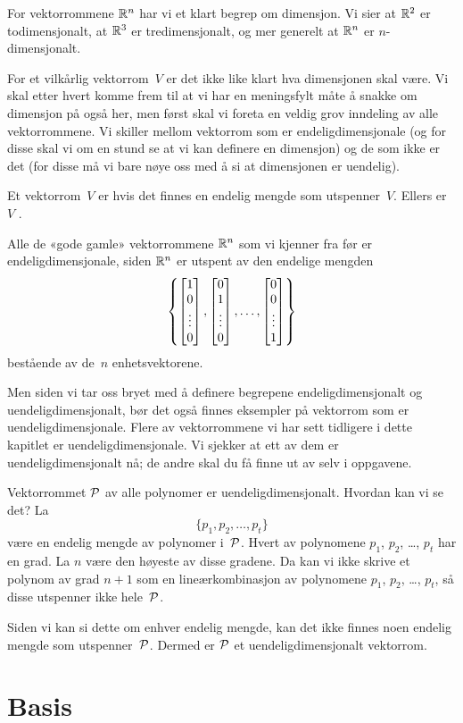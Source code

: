 For vektorrommene $\R^n$ har vi et klart begrep om dimensjon.  Vi sier
at $\R^2$ er todimensjonalt, at $\R^3$ er tredimensjonalt, og mer
generelt at $\R^n$ er $n$-dimensjonalt.

For et vilkårlig vektorrom~$V$ er det ikke like klart hva dimensjonen
skal være.  Vi skal etter hvert komme frem til at vi har en
meningsfylt måte å snakke om dimensjon på også her, men først skal vi
foreta en veldig grov inndeling av alle vektorrommene.  Vi skiller
mellom vektorrom som er endeligdimensjonale (og for disse skal vi om
en stund se at vi kan definere en dimensjon) og de som ikke er det
(for disse må vi bare nøye oss med å si at dimensjonen er uendelig).

\begin{defn}
Et vektorrom~$V$ er  hvis det finnes en
endelig mengde som utspenner~$V$.  Ellers er~$V$
.
\end{defn}

Alle de «gode gamle» vektorrommene $\R^n$ som vi kjenner fra før er
endeligdimensjonale, siden $\R^n$ er utspent av den endelige mengden
\[
\left\{
\vvvv{1}{0}{\vdots}{0},
\vvvv{0}{1}{\vdots}{0},
\ldots,
\vvvv{0}{0}{\vdots}{1}
\right\}
\]
bestående av de~$n$ enhetsvektorene.

Men siden vi tar oss bryet med å definere begrepene
endeligdimensjonalt og uendeligdimensjonalt, bør det også finnes
eksempler på vektorrom som er uendeligdimensjonale.  Flere av
vektorrommene vi har sett tidligere i dette kapitlet er
uendeligdimensjonale.  Vi sjekker at ett av dem er
uendeligdimensjonalt nå; de andre skal du få finne ut av selv i
oppgavene.

\begin{ex}
Vektorrommet $\P$ av alle polynomer er uendeligdimensjonalt.  Hvordan
kan vi se det?  La
\[
\{ p_1, p_2, \ldots, p_t \}
\]
være en endelig mengde av polynomer i~$\P$.  Hvert av polynomene
$p_1$, $p_2$, \ldots, $p_t$ har en grad.  La $n$ være den høyeste av
disse gradene.  Da kan vi ikke skrive et polynom av grad $n+1$ som en
lineærkombinasjon av polynomene $p_1$, $p_2$, \ldots, $p_t$, så disse
utspenner ikke hele~$\P$.

Siden vi kan si dette om enhver endelig mengde, kan det ikke finnes
noen endelig mengde som utspenner~$\P$.  Dermed er $\P$ et
uendeligdimensjonalt vektorrom.
\end{ex}


\section*{Basis}

